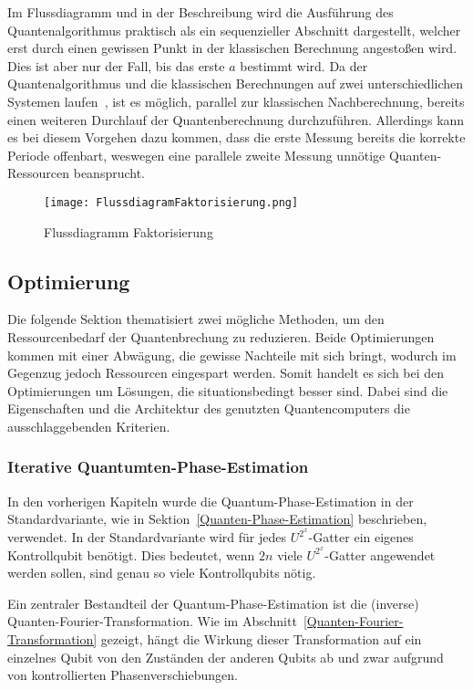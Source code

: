 Im Flussdiagramm und in der Beschreibung 
wird die Ausführung des Quantenalgorithmus praktisch als ein sequenzieller Abschnitt dargestellt, 
welcher erst durch einen gewissen Punkt in der klassischen Berechnung angestoßen wird.
Dies ist aber nur der Fall, bis das erste \(a\) bestimmt wird.
Da der Quantenalgorithmus und die klassischen Berechnungen auf zwei unterschiedlichen Systemen laufen~\cite{IBMQuantumServerless2023}, 
ist es möglich, parallel zur klassischen Nachberechnung, 
bereits einen weiteren Durchlauf der Quantenberechnung durchzuführen. 
Allerdings kann es bei diesem Vorgehen dazu kommen, 
dass die erste Messung bereits die korrekte Periode offenbart, 
weswegen eine parallele zweite Messung unnötige Quanten-Ressourcen beansprucht.

\begin{figure} 
  \centering
  \texttt{[image: FlussdiagramFaktorisierung.png]}
  \caption{Flussdiagramm Faktorisierung}
  \label{fig:Flussdiagramm}
\end{figure}

\subsection{Optimierung} \label{Optimierung}
Die folgende Sektion thematisiert zwei mögliche Methoden, 
um den Ressourcenbedarf der Quantenbrechung zu reduzieren.
Beide Optimierungen kommen mit einer Abwägung, 
die gewisse Nachteile mit sich bringt,
wodurch im Gegenzug jedoch Ressourcen eingespart werden.
Somit handelt es sich bei den Optimierungen um Lösungen, 
die situationsbedingt besser sind.
Dabei sind die Eigenschaften und die Architektur des genutzten Quantencomputers die ausschlaggebenden Kriterien.

\subsubsection{Iterative Quantumten-Phase-Estimation}
In den vorherigen Kapiteln wurde die Quantum-Phase-Estimation in der Standardvariante, 
wie in Sektion~\ref{Quanten-Phase-Estimation} beschrieben, verwendet.
In der Standardvariante wird für jedes \(U^{2^x}\)-Gatter ein eigenes Kontrollqubit benötigt.
Dies bedeutet, wenn \(2n\) viele \(U^{2^x}\)-Gatter angewendet werden sollen, 
sind genau so viele Kontrollqubits nötig.

Ein zentraler Bestandteil der Quantum-Phase-Estimation ist die (inverse) Quanten-Fourier-Transformation. 
Wie im Abschnitt~\ref{Quanten-Fourier-Transformation} gezeigt, 
hängt die Wirkung dieser Transformation auf ein einzelnes Qubit von den Zuständen der anderen Qubits ab 
und zwar aufgrund von kontrollierten Phasenverschiebungen.

